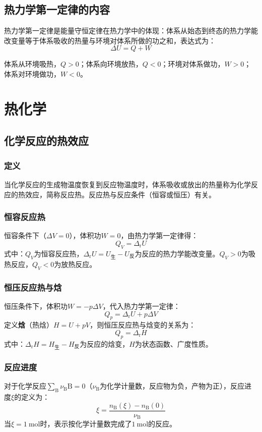 \subsection{热力学第一定律的内容}

热力学第一定律是能量守恒定律在热力学中的体现：体系从始态到终态的热力学能改变量等于体系吸收的热量与环境对体系所做的功之和，表达式为：
\[
\Delta U = Q + W
\]

体系从环境吸热，$Q>0$；体系向环境放热，$Q<0$；环境对体系做功，$W>0$；体系对环境做功，$W<0$。


\section{热化学}

\subsection{化学反应的热效应}
\subsubsection{定义}
当化学反应的生成物温度恢复到反应物温度时，体系吸收或放出的热量称为化学反应的热效应，简称反应热。反应热与反应条件（恒容或恒压）有关。

\subsubsection{恒容反应热}
恒容条件下（$\Delta V=0$），体积功$W=0$，由热力学第一定律得：
\[
Q_V = \Delta_{\text{r}}U
\]
式中：$Q_V$为恒容反应热，$\Delta_{\text{r}}U=U_{\text{生}}-U_{\text{反}}$为反应的热力学能改变量。$Q_V>0$为吸热反应，$Q_V<0$为放热反应。

\subsubsection{恒压反应热与焓}
恒压条件下，体积功$W=-p\Delta V$，代入热力学第一定律：
\[
Q_p = \Delta_{\text{r}}U + p\Delta V
\]
定义\textbf{焓}（热焓）$H=U+pV$，则恒压反应热与焓变的关系为：
\[
Q_p = \Delta_{\text{r}}H
\]
式中：$\Delta_{\text{r}}H=H_{\text{生}}-H_{\text{反}}$为反应的焓变，$H$为状态函数、广度性质。

\subsubsection{反应进度}
对于化学反应$\sum_{\text{B}}\nu_{\text{B}}\text{B}=0$（$\nu_{\text{B}}$为化学计量数，反应物为负，产物为正），反应进度$\xi$的定义为：
\[
\xi = \frac{n_{\text{B}}(\xi) - n_{\text{B}}(0)}{\nu_{\text{B}}}
\]
当$\xi=\qty{1}{\mole}$时，表示按化学计量数完成了$\qty{1}{\mole}$的反应。

